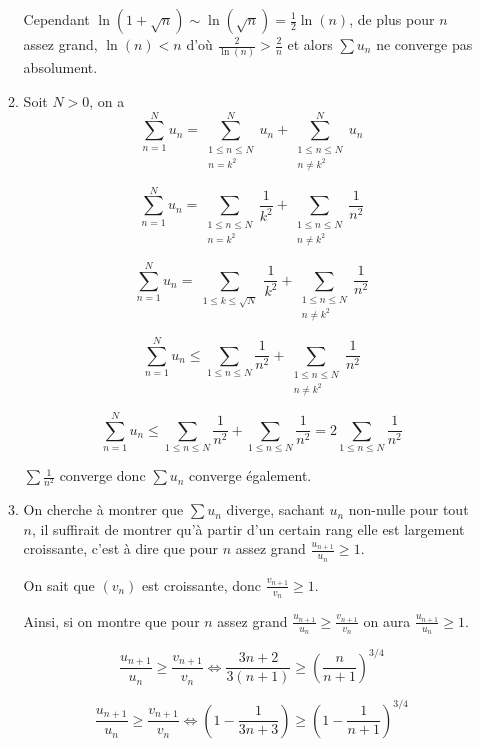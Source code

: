 \documentclass[]{article}
\begin{document}
\begin{enumerate}
\begin{enumerate}
	Cependant $\ln(1+\sqrt{n}) \sim \ln(\sqrt{n})=\frac{1}{2}\ln(n)$, de plus pour $n$ assez grand, $\ln(n) < n$ d'où $\frac{2}{\ln(n)} > \frac{2}{n}$ et alors $\sum u_n$ ne converge pas absolument.
	
	\item Soit $N > 0$, on a $$\sum_{n=1}^{N} u_n = \sum_{\substack{1 \leqslant n \leqslant N \\ n = k^2}}^{N} u_n + \sum_{\substack{1 \leqslant n \leqslant N \\ n \neq k^2}}^{N} u_n$$
	
	$$\sum_{n=1}^{N} u_n = \sum_{\substack{1 \leqslant n \leqslant N \\ n = k^2}} \frac{1}{k^2} + \sum_{\substack{1 \leqslant n \leqslant N \\ n \neq k^2}} \frac{1}{n^2}$$
	
	$$\sum_{n=1}^{N} u_n = \sum_{\substack{1 \leqslant k \leqslant \sqrt{N}}} \frac{1}{k^2} + \sum_{\substack{1 \leqslant n \leqslant N \\ n \neq k^2}} \frac{1}{n^2}$$
	
	$$\sum_{n=1}^{N} u_n \leqslant \sum_{1 \leqslant n \leqslant N} \frac{1}{n^2} + \sum_{\substack{1 \leqslant n \leqslant N \\ n \neq k^2}} \frac{1}{n^2}$$
	
	$$\sum_{n=1}^{N} u_n \leqslant \sum_{1 \leqslant n \leqslant N} \frac{1}{n^2} + \sum_{1 \leqslant n \leqslant N} \frac{1}{n^2} = 2\sum_{1 \leqslant n \leqslant N} \frac{1}{n^2}$$
	
	$\sum \frac{1}{n^2}$ converge donc $\sum u_n$ converge également.
	
	\item On cherche à montrer que $\sum u_n$ diverge, sachant $u_n$ non-nulle pour tout $n$, il suffirait de montrer qu'à partir d'un certain rang elle est largement croissante, c'est à dire que pour $n$ assez grand $\frac{u_{n+1}}{u_n} \geqslant 1$.
	
	On sait que $(v_n)$ est croissante, donc $\frac{v_{n+1}}{v_n} \geqslant 1$.
	
	Ainsi, si on montre que pour $n$ assez grand $\frac{u_{n+1}}{u_n} \geqslant \frac{v_{n+1}}{v_n}$ on aura $\frac{u_{n+1}}{u_n} \geqslant 1$.
	
	$$\frac{u_{n+1}}{u_n} \geqslant \frac{v_{n+1}}{v_n} \Longleftrightarrow \frac{3n+2}{3(n+1)} \geqslant \left(\frac{n}{n+1}\right)^{3/4}$$
	
	$$\frac{u_{n+1}}{u_n} \geqslant \frac{v_{n+1}}{v_n} \Longleftrightarrow \left(1-\frac{1}{3n+3}\right) \geqslant \left(1-\frac{1}{n+1}\right)^{3/4}$$
	

\end{enumerate}
\end{enumerate}
\end{document}
